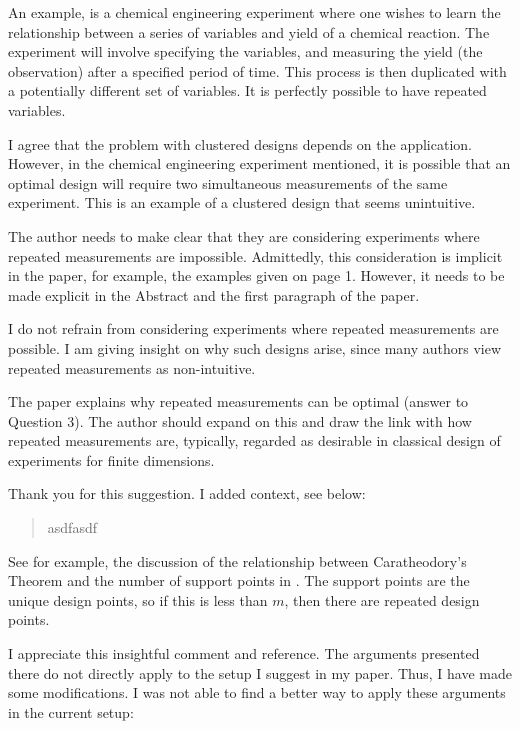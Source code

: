 \RC An example, is a chemical engineering experiment where one wishes
to learn the relationship between a series of variables and yield of a
chemical reaction. The experiment will involve specifying the
variables, and measuring the yield (the observation) after a specified
period of time. This process is then duplicated with a potentially
different set of variables.  It is perfectly possible to have repeated
variables.

\AR I agree that the problem with clustered designs depends on the
application. However, in the chemical engineering experiment
mentioned, it is possible that an optimal design will require two
simultaneous measurements of the same experiment. This is an example
of a clustered design that seems unintuitive.

 
\RC The author needs to make clear that they are considering
experiments where repeated measurements are impossible. Admittedly,
this consideration is implicit in the paper, for example, the examples
given on page 1. However, it needs to be made explicit in the Abstract
and the first paragraph of the paper.

\AR I do not refrain from considering experiments where repeated
measurements are possible. I am giving insight on why such designs
arise, since many authors view repeated measurements as non-intuitive.

  
\RC The paper explains why repeated measurements can be optimal
(answer to Question 3). The author should expand on this and draw the
link with how repeated measurements are, typically, regarded as
desirable in classical design of experiments for finite
dimensions.

\AR Thank you for this suggestion. I added context, see below:

\begin{quote}
  asdfasdf
\end{quote}

\RC See for example, the discussion of the relationship between
Caratheodory’s Theorem and the number of support points in \cite[page
  139]{pronzatoPazman2013}. The support points are the unique design
points, so if this is less than $m$, then there are repeated design
points.
  
\AR I appreciate this insightful comment and reference. The arguments
presented there do not directly apply to the setup I suggest in my
paper. Thus, I have made some modifications. I was not able to find a
better way to apply these arguments in the current setup:

